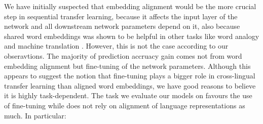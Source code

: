 \documentclass[]{article}
\begin{document}
We have initially suspected that embedding alignment would be the more crucial step in sequential transfer learning, because it affects the input layer of the network and all downstream network parameters depend on it, also because shared word embeddings was shown to be helpful in other tasks like word analogy and machine translation \cite{mikolov2013exploiting,artetxe2017learning}. However, this is not the case according to our obseravtions. The majority of prediction accruacy gain comes not from word embedding alignment but fine-tuning of the network parameters. Although this appears to suggest the notion that fine-tuning plays a bigger role in cross-lingual transfer learning than aligned word embeddings, we have good reasons to believe it is highly task-dependent. The task we evaluate our models on favours the use of fine-tuning while does not rely on alignment of language representations as much. In particular:
\end{document}
